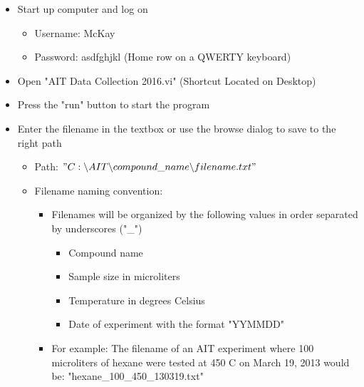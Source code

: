 \documentclass[letterpaper,11pt]{article}
\begin{document}
    \begin{itemize}
    \item Start up computer and log on
    
        \begin{itemize}
        \item Username: McKay
        \item Password: asdfghjkl (Home row on a QWERTY keyboard)
        \end{itemize}
        
    \item Open "AIT Data Collection 2016.vi" (Shortcut Located on Desktop)
    \item Press the "run" button to start the program
        
    \item Enter the filename in the textbox or use the browse dialog to save to 
        the right path
        
        \begin{itemize}
        \item Path: $"C:\backslash AIT\backslash compound\_name
            \backslash filename .txt"$
        
        \item Filename naming convention: 
            
            \begin{itemize}
            \item Filenames will be organized by the following values in order 
                separated by underscores ("\_")
                
                    \begin{itemize}
                    \item Compound name
                    \item Sample size in microliters
                    \item Temperature in degrees Celsius
                    \item Date of experiment with the format "YYMMDD"
                    \end{itemize}
                    
            \item For example: The filename of an AIT experiment where 100 
                microliters of hexane were tested at 450 C on March 19, 2013 
                would be: "hexane\_100\_450\_130319.txt"
            \end{itemize}    
                

\end{itemize}
\end{itemize}
\end{document}
